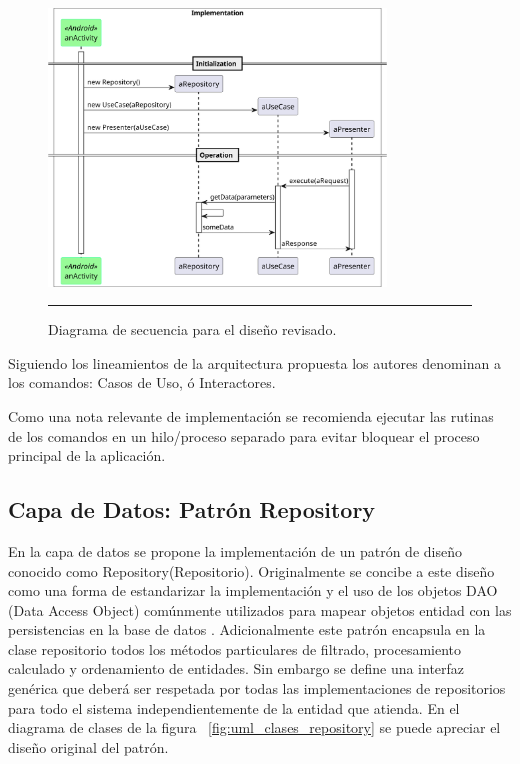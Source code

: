 \begin{figure}[htbp]
	\centering
	\includegraphics[width=0.8\textwidth]{Figures/design/SEQ_command_app.png}
	\rule{35em}{1pt}
	\caption[Commander Review]{Diagrama de secuencia para el diseño revisado.}
	\label{fig:uml_commander_sequence_req_resp}
\end{figure}

Siguiendo los lineamientos de la arquitectura propuesta los autores denominan a los comandos: Casos de Uso, ó Interactores.

Como una nota relevante de implementación se recomienda ejecutar las rutinas de los comandos en un hilo/proceso separado para evitar bloquear el proceso principal de la aplicación.

\subsection{Capa de Datos: Patrón Repository}
\label{section:repository}
En la capa de datos se propone la implementación de un patrón de diseño conocido como Repository(Repositorio). 
Originalmente se concibe a este diseño como una forma de estandarizar la implementación y el uso de los objetos DAO (Data Access Object) comúnmente utilizados para mapear objetos entidad con las persistencias en la base de datos \cite{repo_wolf}.
Adicionalmente este patrón encapsula en la clase repositorio todos los métodos particulares de filtrado, procesamiento calculado y ordenamiento de entidades.
Sin embargo se define una interfaz genérica que deberá ser respetada por todas las implementaciones de repositorios para todo el sistema independientemente de la entidad que atienda.
En el diagrama de clases de la figura ~\ref{fig:uml_clases_repository} se puede apreciar el diseño original del patrón.

